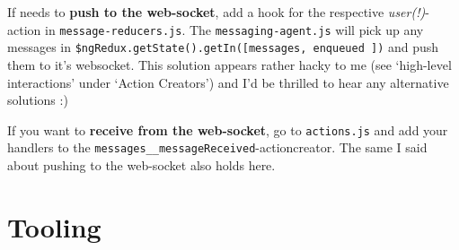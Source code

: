 If needs to \textbf{push to the web-socket}, add a hook for the
respective \emph{user(!)}-action in \texttt{message-reducers.js}. The
\texttt{messaging-agent.js} will pick up any messages in
\texttt{\$ngRedux.getState().getIn({[\textquotesingle{}messages\textquotesingle{},
\textquotesingle{}enqueued\textquotesingle{}  ]})}
and push them to it's websocket. This solution appears rather hacky to
me (see `high-level interactions' under `Action Creators') and I'd be
thrilled to hear any alternative solutions :)

If you want to \textbf{receive from the web-socket}, go to
\texttt{actions.js} and add your handlers to the
\texttt{messages\_\_messageReceived}-actioncreator. The same I said
about pushing to the web-socket also holds here.
\section{Tooling}\label{tooling}

